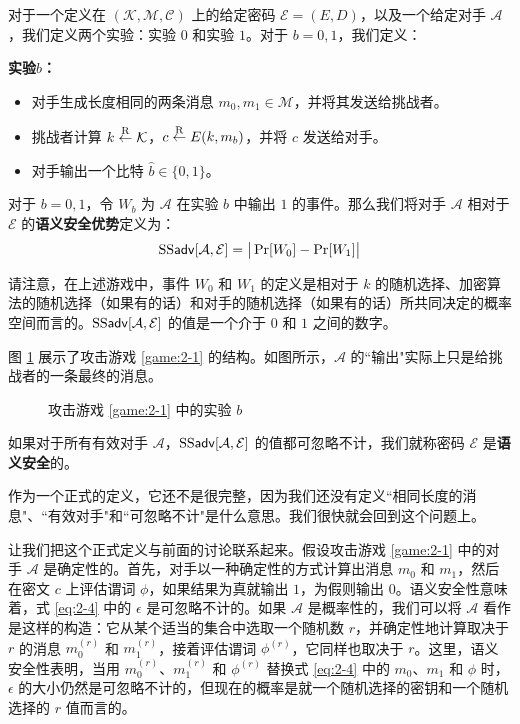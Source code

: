 \begin{game}[语义安全性]\label{game:2-1}
对于一个定义在 $(\mathcal{K},\mathcal{M},\mathcal{C})$ 上的给定密码 $\mathcal{E}=(E,D)$，以及一个给定对手 $\mathcal{A}$，我们定义两个实验：实验 $0$ 和实验 $1$。对于 $b=0,1$，我们定义：

\noindent\textbf{实验$b$：}
\begin{itemize}
	\item 对手生成长度相同的两条消息 $m_0,m_1\in\mathcal{M}$，并将其发送给挑战者。
	\item 挑战者计算 $k\overset{\rm R}\leftarrow\mathcal{K}$，$c\overset{\rm R}\leftarrow E(k,m_b)$，并将 $c$ 发送给对手。
	\item 对手输出一个比特 $\hat b\in\{0,1\}$。
\end{itemize}

对于 $b=0,1$，令 $W_b$ 为 $\mathcal{A}$ 在实验 $b$ 中输出 $1$ 的事件。那么我们将对手 $\mathcal{A}$ 相对于 $\mathcal{E}$ 的\textbf{语义安全优势}定义为：
\[
{\rm SS\mathsf{adv}}[\mathcal{A},\mathcal{E}]=
\big\lvert
\Pr[W_0] -\Pr[W_1]
\big\rvert
\]
\end{game}

请注意，在上述游戏中，事件 $W_0$ 和 $W_1$ 的定义是相对于 $k$ 的随机选择、加密算法的随机选择（如果有的话）和对手的随机选择（如果有的话）所共同决定的概率空间而言的。${\rm SS\mathsf{adv}}[\mathcal{A},\mathcal{E}]$ 的值是一个介于 $0$ 和 $1$ 之间的数字。

图 \ref{fig:2-1} 展示了攻击游戏 \ref{game:2-1} 的结构。如图所示，$\mathcal{A}$ 的``输出"实际上只是给挑战者的一条最终的消息。

\begin{figure}
	\centering
	
	\caption{攻击游戏 \ref{game:2-1} 中的实验 $b$}
	\label{fig:2-1}
\end{figure}

\begin{definition}[语义安全性]\label{def:2-2}
如果对于所有有效对手 $\mathcal{A}$，${\rm SS\mathsf{adv}}[\mathcal{A},\mathcal{E}]$ 的值都可忽略不计，我们就称密码 $\mathcal{E}$ 是\textbf{语义安全}的。
\end{definition}

作为一个正式的定义，它还不是很完整，因为我们还没有定义``相同长度的消息"、``有效对手"和``可忽略不计"是什么意思。我们很快就会回到这个问题上。

让我们把这个正式定义与前面的讨论联系起来。假设攻击游戏 \ref{game:2-1} 中的对手 $\mathcal{A}$ 是确定性的。首先，对手以一种确定性的方式计算出消息 $m_0$ 和 $m_1$，然后在密文 $c$ 上评估谓词 $\phi$，如果结果为真就输出 $1$，为假则输出 $0$。语义安全性意味着，式 \ref{eq:2-4} 中的 $\epsilon$ 是可忽略不计的。如果 $\mathcal{A}$ 是概率性的，我们可以将 $\mathcal{A}$ 看作是这样的构造：它从某个适当的集合中选取一个随机数 $r$，并确定性地计算取决于 $r$ 的消息 $m^{(r)}_0$ 和 $m^{(r)}_1$，接着评估谓词 $\phi^{(r)}$，它同样也取决于 $r$。这里，语义安全性表明，当用 $m^{(r)}_0$、$m^{(r)}_1$ 和 $\phi^{(r)}$ 替换式 \ref{eq:2-4} 中的 $m_0$、$m_1$ 和 $\phi$ 时，$\epsilon$ 的大小仍然是可忽略不计的，但现在的概率是就一个随机选择的密钥和一个随机选择的 $r$ 值而言的。

